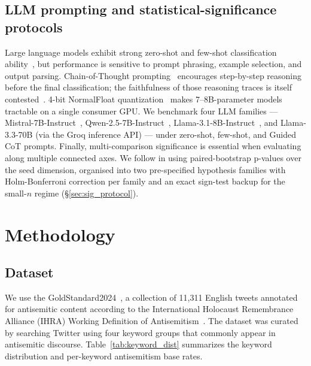 \documentclass[10pt,a4paper]{article}
\newcommand{\dataset}{GoldStandard2024}
\begin{document}
\subsection{LLM prompting and statistical-significance protocols}

Large language models exhibit strong zero-shot and few-shot classification ability~\citep{brown2020language}, but performance is sensitive to prompt phrasing, example selection, and output parsing. Chain-of-Thought prompting~\citep{wei2022chain} encourages step-by-step reasoning before the final classification; the faithfulness of those reasoning traces is itself contested~\citep{turpin2023language}. 4-bit NormalFloat quantization~\citep{dettmers2022gptint} makes 7--8B-parameter models tractable on a single consumer GPU. We benchmark four LLM families --- Mistral-7B-Instruct~\citep{jiang2023mistral}, Qwen-2.5-7B-Instruct~\citep{qwen25}, Llama-3.1-8B-Instruct~\citep{llama31}, and Llama-3.3-70B (via the Groq inference API) --- under zero-shot, few-shot, and Guided CoT prompts. Finally, multi-comparison significance is essential when evaluating along multiple connected axes. We follow \citet{dror2018hitchhikers} in using paired-bootstrap p-values over the seed dimension, organised into two pre-specified hypothesis families with Holm-Bonferroni correction per family and an exact sign-test backup for the small-$n$ regime (\S\ref{sec:sig_protocol}).


\section{Methodology}
\label{sec:methodology}

\subsection{Dataset}
\label{sec:dataset}

We use the \dataset{}~\citep{jikeli2024goldstandard}, a collection of 11,311 English tweets annotated for antisemitic content according to the International Holocaust Remembrance Alliance (IHRA) Working Definition of Antisemitism~\citep{ihra2016working}. The dataset was curated by searching Twitter using four keyword groups that commonly appear in antisemitic discourse. Table~\ref{tab:keyword_dist} summarizes the keyword distribution and per-keyword antisemitism base rates.
\end{document}
